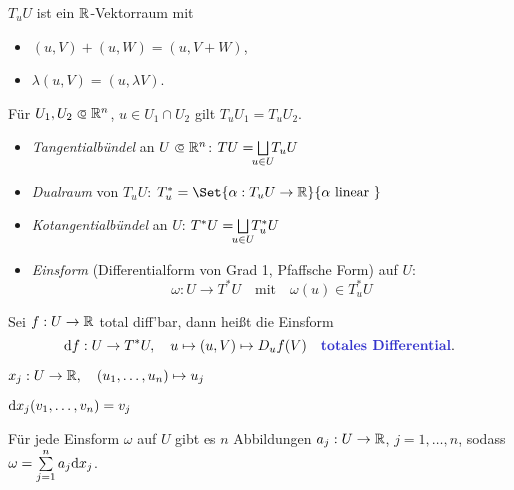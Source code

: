 \documentclass{cheat-sheet}
\theoremstyle{definition}
\begin{document}
\begin{bem}
  $T_u U$ ist ein $\mathbb{R}$-Vektorraum mit
  \begin{multicols}{2}
    \begin{itemize}
      \item $(u, V) + (u, W) = (u, V + W)$,
      \item $\lambda (u, V) = (u, \lambda V)$.
    \end{itemize}
  \end{multicols}
\end{bem}

\begin{bem}
  Für $U_1, U_2 \opn \R^n$, $u \in U_1 \cap U_2$ gilt $T_u U_1 = T_u U_2$.
\end{bem}

\begin{defn}
  \begin{itemize}
    \item \emph{Tangentialbündel} an $U \opn \R^n$: $TU = \bigsqcup_{\mathclap{u \in U}} T_u U$
    \item \emph{Dualraum} von $T_u U$: $T_u^* = \Set{ \alpha : T_u U \to \R }{ \alpha \text{ linear } }$
    \item \emph{Kotangentialbündel} an $U$: $T^* U = \bigsqcup_{\mathclap{u \in U}} T_u^* U$
    \item \emph{Einsform} (Differentialform von Grad 1, Pfaffsche Form) auf $U$:
\[ \omega : U \to T^*U \quad \text{mit} \quad \omega(u) \in T_u^*U \]
  \end{itemize}
\end{defn}


\begin{bsp}
  Sei $f : U \to \mathbb{R}$ total diff'bar, dann heißt die Einsform
  \[ \d f : U \to T^*U, \quad u \mapsto (u, V) \mapsto D_u f (V) \quad \text{\emph{totales Differential}.} \]
\end{bsp}

\begin{nota}
  $x_j : U \to \mathbb{R}, \quad (u_1, \ldots, u_n) \mapsto u_j$ %
\end{nota}

\begin{bem}
  $\mathrm{d} x_j (v_1, \ldots, v_n) = v_j$
\end{bem}


\iffalse %
\begin{beobachtung}
  Für jede Einsform $\omega$ auf $U$ gibt es $n$ Abbildungen $a_j : U \to \mathbb{R}$, $j = 1, \ldots, n$, sodass $\omega = \sum_{j=1}^n a_j \d x_j$.
\end{beobachtung}
\end{document}

